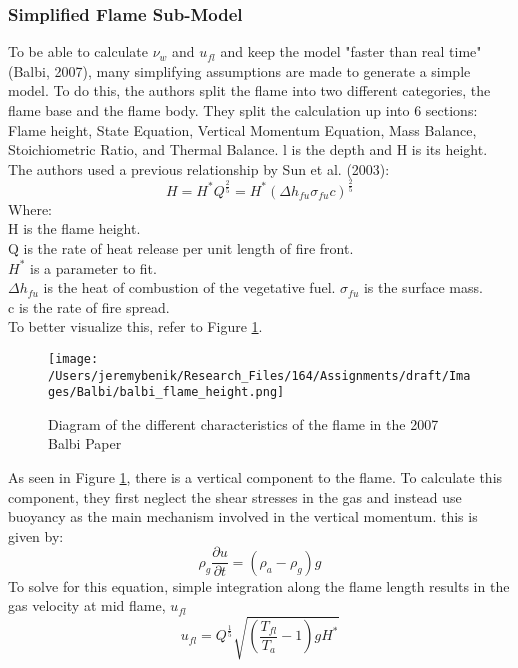 \documentclass{article}
\begin{document}
\subsubsection{Simplified Flame Sub-Model}
\indent To be able to calculate $\nu _ w$ and $u_{fl}$ and keep the model "faster than real time" (Balbi, 2007), many simplifying assumptions are made to generate a simple model. To do this, the authors split the flame into two different categories, the flame base and the flame body. They split the calculation up into 6 sections: Flame height, State Equation, Vertical Momentum Equation, Mass Balance, Stoichiometric Ratio, and Thermal Balance. l is the depth and H is its height. The authors used a previous relationship by Sun et al. (2003):
\begin{equation}
	\label{Flame height}
	H = H^{*} Q^{\frac {2}{5}} = H^{*}(\Delta h_{fu} \sigma _{fu} c) ^{\frac {2}{5}}
\end{equation}
Where:\\
H is the flame height.\\
Q is the rate of heat release per unit length of fire front. \\
$H^{*}$ is a parameter to fit. \\
$\Delta h_{fu}$ is the heat of combustion of the vegetative fuel. 
$\sigma _{fu}$ is the surface mass. \\
c is the rate of fire spread.  \\ 
To better visualize this, refer to Figure \ref{Balbi_flae_height_diagram}.
\begin{figure}
  \texttt{[image: /Users/jeremybenik/Research\_Files/164/Assignments/draft/Images/Balbi/balbi\_flame\_height.png]}
  \caption{Diagram of the different characteristics of the flame in the 2007 Balbi Paper}
  \label{Balbi_flae_height_diagram}
\end{figure}

\indent As seen in Figure \ref{Balbi_flae_height_diagram}, there is a vertical component to the flame. To calculate this component, they first neglect the shear stresses in the gas and instead use buoyancy as the main mechanism involved in the vertical momentum. this is given by: 
\begin{equation}
	\label{Vertical momentum Balbi}
	\rho _ g \frac {\partial u} {\partial t} = (\rho _a - \rho _g) g
\end{equation}
\indent To solve for this equation, simple integration along the flame length results in the gas velocity at mid flame, $u_{fl}$
\begin{equation}
	\label{gas velocity}
	u_{fl} = Q ^ {\frac {1}{5}} \sqrt{(\frac {T_{fl}} {T_a} - 1) g H^{*}}
\end{equation}
\end{document}
